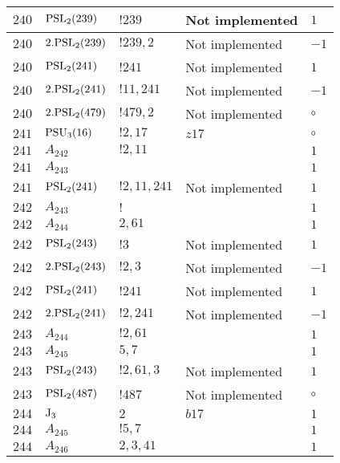 \documentclass[a4paper, 11pt]{article}
\begin{document}
\begin{longtable}{lllll}
        $ 240 $ & $ {\rm PSL}_{2}(239) $ & $ !239 $ &  Not implemented & $ 1$ \\ \hline
        $ 240 $ & $ 2.{\rm PSL}_{2}(239) $ & $ !239, 2 $ &  Not implemented & $ -1$ \\ \hline
        $ 240 $ & $ {\rm PSL}_{2}(241) $ & $ !241 $ &  Not implemented & $ 1$ \\ \hline
        $ 240 $ & $ 2.{\rm PSL}_{2}(241) $ & $ !11, 241 $ &  Not implemented & $ -1$ \\ \hline
        $ 240 $ & $ 2.{\rm PSL}_{2}(479) $ & $ !479, 2 $ &  Not implemented &  $\circ$ \\ \hline
        $ 241 $ & $ {\rm PSU}_{3}(16) $ & $ ! 2,17 $ & $ z17 $ &  $\circ$ \\ \hline
        $ 241 $ & $ A_{242} $ & $ !2, 11 $ & $ ~ $ & $ 1$ \\ \hline
        $ 241 $ & $ A_{243} $ & $ ~ $ & $ ~ $ & $ 1$ \\ \hline
        $ 241 $ & $ {\rm PSL}_{2}(241) $ & $ !2, 11, 241 $ &  Not implemented & $ 1$ \\ \hline
        $ 242 $ & $ A_{243} $ & $ ! $ & $ ~ $ & $ 1$ \\ \hline
        $ 242 $ & $ A_{244} $ & $ 2, 61 $ & $ ~ $ & $ 1$ \\ \hline
        $ 242 $ & $ {\rm PSL}_{2}(243) $ & $ !3 $ &  Not implemented & $ 1$ \\ \hline
        $ 242 $ & $ 2.{\rm PSL}_{2}(243) $ & $ !2, 3 $ &  Not implemented & $ -1$ \\ \hline
        $ 242 $ & $ {\rm PSL}_{2}(241) $ & $ !241 $ &  Not implemented & $ 1$ \\ \hline
        $ 242 $ & $ 2.{\rm PSL}_{2}(241) $ & $ !2, 241 $ &  Not implemented & $ -1$ \\ \hline
        $ 243 $ & $ A_{244} $ & $ !2, 61 $ & $ ~ $ & $ 1$ \\ \hline
        $ 243 $ & $ A_{245} $ & $ 5, 7 $ & $ ~ $ & $ 1$ \\ \hline
        $ 243 $ & $ {\rm PSL}_{2}(243) $ & $ !2, 61, 3 $ &  Not implemented & $ 1$ \\ \hline
        $ 243 $ & $ {\rm PSL}_{2}(487) $ & $ !487 $ &  Not implemented &  $\circ$ \\ \hline
        $ 244 $ & $ {\rm J}_3 $ & $ 2 $ & $ b17 $ & $ 1$ \\ \hline
        $ 244 $ & $ A_{245} $ & $ !5, 7 $ & $ ~ $ & $ 1$ \\ \hline
        $ 244 $ & $ A_{246} $ & $ 2, 3, 41 $ & $ ~ $ & $ 1$ \\ \hline

\end{longtable}
\end{document}

